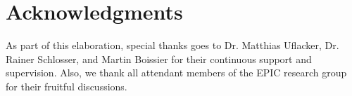 \documentclass{sig-alternate-05-2015}
\begin{document}












\section*{Acknowledgments}
As part of this elaboration, special thanks goes to Dr. Matthias Uflacker, Dr. Rainer Schlosser, and Martin Boissier for their continuous support and supervision. Also, we thank all attendant members of the EPIC research group for their fruitful discussions.



  
\end{document}
